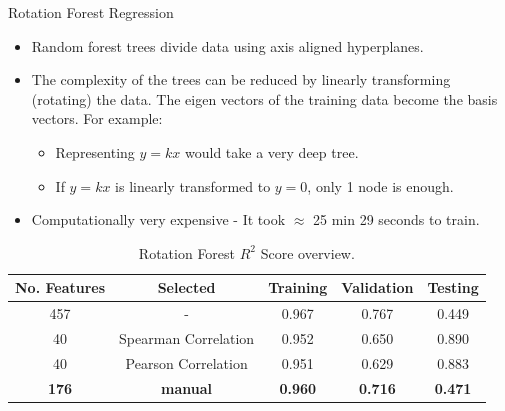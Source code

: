 \documentclass{beamer}
\begin{document}
\begin{frame}[t]{Rotation Forest Regression}
\begin{itemize}
\item Random forest trees divide data using axis aligned hyperplanes.
\item The complexity of the trees can be reduced by linearly transforming (rotating) the data.  The eigen vectors of the training data become the basis vectors.  For example:
\begin{itemize}
\item Representing $y = kx$ would take a very deep tree.
\item If $y = kx$ is linearly transformed to $y = 0$,  only 1 node is enough.
\end{itemize}

\item Computationally very expensive - It took $\approx$ 25 min 29 seconds to train.
\end{itemize}

\begin{table} [h!]
\centering
\resizebox{0.7\linewidth}{!} {
 \begin{tabular}{ | c | c | c | c | c | }
\hline
\textbf{No.  Features} & \textbf{Selected} & \textbf{Training} & \textbf{Validation} & \textbf{Testing} \\ [0.5 ex]
\hline \hline
457 & - & 0.967 & 0.767 & 0.449\\
40 & Spearman Correlation & 0.952 & 0.650 & 0.890\\
40 & Pearson Correlation & 0.951 & 0.629 & 0.883 \\
\textbf{176} & \textbf{manual} & \textbf{0.960} & \textbf{0.716} & \textbf{0.471} \\ [1ex]
\hline
\end{tabular}
}
\caption{Rotation Forest $R^2$ Score overview.}
\label {table:4}
\end{table}

\end{frame}
\end{document}
